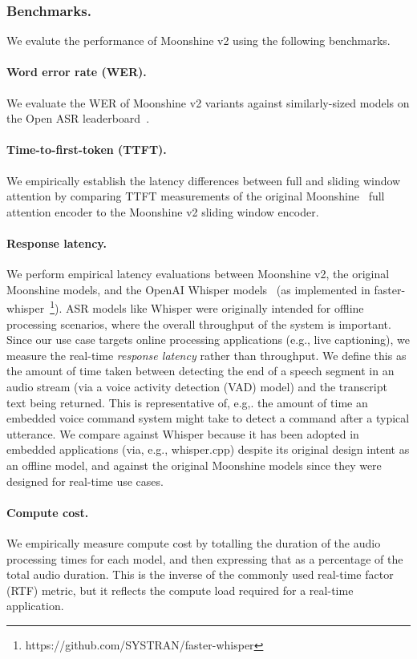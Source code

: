 \subsubsection{Benchmarks.}
We evalute the performance of Moonshine v2 using the following benchmarks.

\paragraph{Word error rate (WER).} We evaluate the WER of Moonshine v2 variants against similarly-sized models on the Open ASR leaderboard~\citep{srivastav2025open}.

\paragraph{Time-to-first-token (TTFT).} We empirically establish the latency differences between full and sliding window attention by comparing TTFT measurements of the original Moonshine~\citep{jeffries2024moonshinespeechrecognitionlive} full attention encoder to the Moonshine v2 sliding window encoder.

\paragraph{Response latency.} We perform empirical latency evaluations between Moonshine v2, the original Moonshine models, and the OpenAI Whisper models~\citep{radford2022robustspeechrecognitionlargescale} (as implemented in faster-whisper~\footnote{https://github.com/SYSTRAN/faster-whisper}). ASR models like Whisper were originally intended for offline processing scenarios, where the overall throughput of the system is important. Since our use case targets online processing applications (e.g., live captioning), we measure the real-time \emph{response latency} rather than throughput. We define this as the amount of time taken between detecting the end of a speech segment in an audio stream (via a voice activity detection (VAD) model) and the transcript text being returned. This is representative of, e.g,. the amount of time an embedded voice command system might take to detect a command after a typical utterance. We compare against Whisper because it has been adopted in embedded applications (via, e.g., whisper.cpp) despite its original design intent as an offline model, and against the original Moonshine models since they were designed for real-time use cases.

\paragraph{Compute cost.} We empirically measure compute cost by totalling the duration of the audio processing times for each model, and then expressing that as a percentage of the total audio duration. This is the inverse of the commonly used real-time factor (RTF) metric, but it reflects the compute load required for a real-time application.


